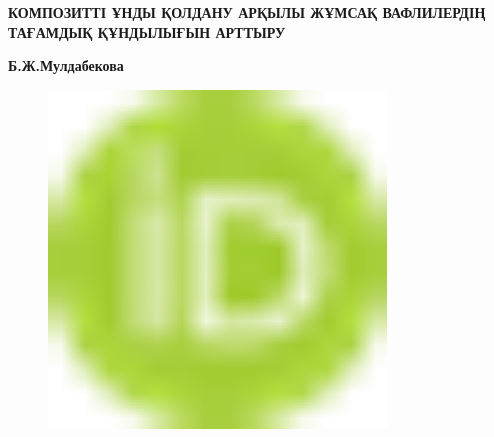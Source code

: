 
{\bfseries КОМПОЗИТТІ ҰНДЫ ҚОЛДАНУ АРҚЫЛЫ ЖҰМСАҚ ВАФЛИЛЕРДІҢ ТАҒАМДЫҚ
ҚҰНДЫЛЫҒЫН АРТТЫРУ}

{\bfseries Б.Ж.Мулдабекова}
\begin{figure}[H]
	\centering
	\includegraphics[width=0.8\textwidth]{media/pish/image10}
	\caption*{}
\end{figure}


